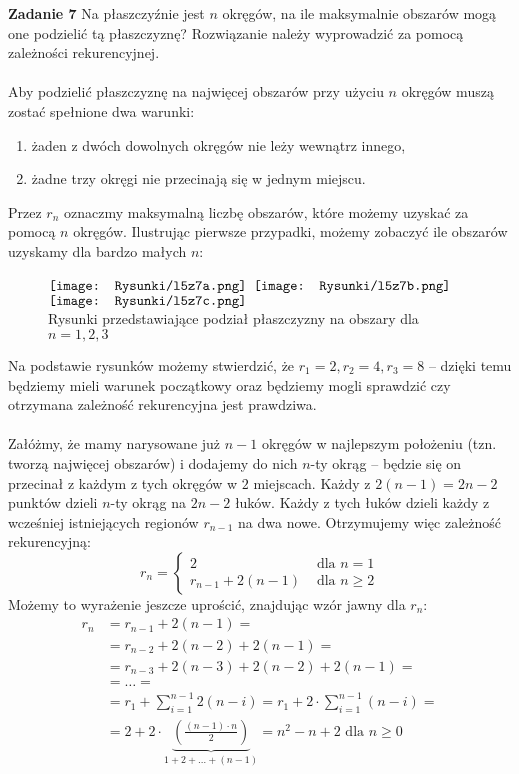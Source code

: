 \documentclass[a4paper,12pt]{article}
\begin{document}
\newpage
\noindent \textbf{Zadanie 7} \newline
Na płaszczyźnie jest $n$ okręgów, na ile maksymalnie obszarów mogą one podzielić tą płaszczyznę? Rozwiązanie należy wyprowadzić za pomocą zależności rekurencyjnej. \\ \\
Aby podzielić płaszczyznę na najwięcej obszarów przy użyciu $n$ okręgów muszą zostać spełnione dwa warunki:
\begin{enumerate}
	\item żaden z dwóch dowolnych okręgów nie leży wewnątrz innego,
	\item żadne trzy okręgi nie przecinają się w jednym miejscu.
\end{enumerate} 
Przez $r_n$ oznaczmy maksymalną liczbę obszarów, które możemy uzyskać za pomocą $n$ okręgów. Ilustrując pierwsze przypadki, możemy zobaczyć ile obszarów uzyskamy dla bardzo małych $n$:

\begin{figure}[H] %
	\centering
	$\vcenter{\hbox{\texttt{[image: Rysunki/l5z7a.png]}}}$
	$\vcenter{\hbox{\texttt{[image: Rysunki/l5z7b.png]}}}$
	$\vcenter{\hbox{\texttt{[image: Rysunki/l5z7c.png]}}}$
	\\ Rysunki przedstawiające podział płaszczyzny na obszary dla $n = 1, 2, 3$
\end{figure}
\noindent Na podstawie rysunków możemy stwierdzić, że $r_1 = 2, r_2 = 4, r_3 = 8$ -- dzięki temu będziemy mieli warunek początkowy oraz będziemy mogli sprawdzić czy otrzymana zależność rekurencyjna jest prawdziwa.\\ \\
Załóżmy, że mamy narysowane już $n - 1$ okręgów w najlepszym położeniu (tzn. tworzą najwięcej obszarów) i dodajemy do nich $n$-ty okrąg -- będzie się on przecinał z każdym z tych okręgów w $2$ miejscach. Każdy z $2(n - 1) = 2n - 2$ punktów dzieli $n$-ty okrąg na $2n - 2$ łuków. Każdy z tych łuków dzieli każdy z wcześniej istniejących regionów $r_{n-1}$ na dwa nowe. Otrzymujemy więc zależność rekurencyjną:
\[ 
r_n =
\begin{cases}
2 						&\text{ dla } n = 1 \\
r_{n - 1} + 2(n - 1) 	&\text{ dla } n \geq 2
\end{cases}
\]
Możemy to wyrażenie jeszcze uprościć, znajdując wzór jawny dla $r_n$:
\begin{align*}
	r_n &= r_{n - 1} + 2(n - 1) = \\
		&= r_{n - 2} + 2(n - 2) + 2(n - 1) = \\
		&= r_{n - 3} + 2(n - 3) + 2(n - 2) + 2(n - 1) = \\
		&= \ldots = \\
		&= r_1 + \sum\limits_{i = 1}^{n-1} 2(n - i) = r_1 + 2\cdot \sum\limits_{i = 1}^{n-1} (n - i) = \\
		&= 2 + 2 \cdot \underbrace{\left( \frac{(n - 1)\cdot n}{2} \right)}_{1 + 2 + \ldots + (n - 1)} = n^2 - n + 2 \text{ dla } n \geq 0
\end{align*}
\end{document}
